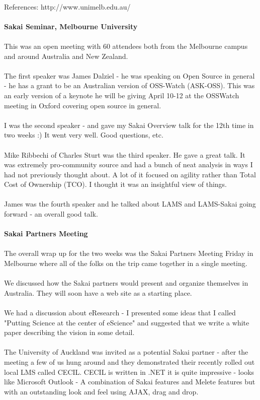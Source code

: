 \documentclass[12pt]{book}
\begin{document}
\\
References: http://www.unimelb.edu.au/\\
\\
{\bf Sakai Seminar, Melbourne University}\\
\\
This was an open meeting with 60 attendees both from the Melbourne campus and around Australia and New Zealand.\\
\\
The first speaker was   James Dalziel - he was speaking on Open Source in general - he has a grant to be an Australian version of OSS-Watch (ASK-OSS).   This was an early version of a keynote he will be giving   April 10-12 at the OSSWatch meeting in Oxford covering open source in general.   \\
\\
I was the second speaker - and gave my Sakai Overview talk for the 12th time in two weeks :)   It went very well.   Good questions, etc.   \\
\\
Mike Ribbechi of Charles Sturt was the third speaker.   He gave a great talk.   It was extremely pro-community source and had a bunch of neat analysis in ways I had not previously thought about.   A lot of it focused on agility rather than Total Cost of Ownership (TCO).    I thought it was an insightful view of things.\\
\\
James was the fourth speaker and he talked about LAMS and LAMS-Sakai going forward - an overall good talk.\\
\\
{\bf Sakai Partners Meeting}\\
\\
The overall wrap up for the two weeks was the Sakai Partners Meeting Friday in Melbourne where all of the folks on the trip came together in a single meeting.\\
\\
We discussed how the Sakai partners would present and organize themselves in Australia.   They will soon have a web site as a starting place.   \\
\\
We had a discussion about eResearch - I presented some ideas that I called "Putting Science at the center of eScience" and suggested that we write a white paper describing the vision in some detail.\\
\\
The University of Auckland was invited as a potential Sakai partner - after the meeting a few of us hung around and they demonstrated their recently rolled out local LMS called CECIL.   CECIL is written in .NET it is   quite impressive - looks like Microsoft Outlook - A combination of Sakai features and Melete features but with an outstanding look and feel using AJAX, drag and drop.  \\
\end{document}
